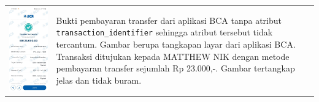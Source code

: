 \begin{table}[h!]
\begin{tabularx}{\textwidth}{m{} X}
        \includegraphics[width=\linewidth]{images/contoh-data/tf-1.jpg}
        & 
        Bukti pembayaran transfer dari aplikasi BCA tanpa atribut \texttt{transaction\_identifier} sehingga atribut tersebut tidak tercantum. Gambar berupa tangkapan layar dari aplikasi BCA. Transaksi ditujukan kepada MATTHEW NIK dengan metode pembayaran transfer sejumlah Rp 23.000,-. Gambar tertangkap jelas dan tidak buram. \\
    \end{tabularx}
\end{table}

